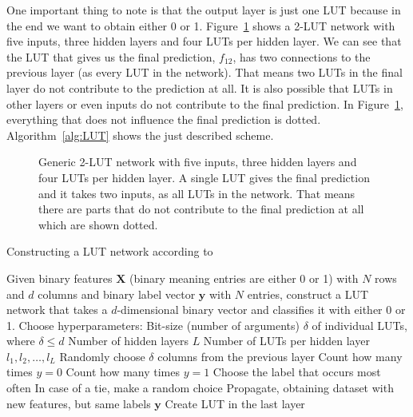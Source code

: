 \noindent One important thing to note is that the output layer is just one LUT because in the end we want to obtain either 0 or 1. Figure~\ref{fig:medium_LUT_network} shows a 2-LUT network with five inputs, three hidden layers and four LUTs per hidden layer. We can see that the LUT that gives us the final prediction, $f_{12}$, has two connections to the previous layer (as every LUT in the network). That means two LUTs in the final layer do not contribute to the prediction at all. It is also possible that LUTs in other layers or even inputs do not contribute to the final prediction. In Figure~\ref{fig:medium_LUT_network}, everything that does not influence the final prediction is dotted. Algorithm~\ref{alg:LUT} shows the just described scheme.

\begin{figure}[!htb]
    \centering
    
    \caption{Generic 2-LUT network with five inputs, three hidden layers and four LUTs per hidden layer. A single LUT gives the final prediction and it takes two inputs, as all LUTs in the network. That means there are parts that do not contribute to the final prediction at all which are shown dotted.}
\label{fig:medium_LUT_network}
\end{figure}
\FloatBarrier


\begin{algorithm}
  \caption{Constructing a LUT network according to \cite{bib:chatterjee2018learning}}
  \label{alg:LUT}
  \begin{algorithmic}
    \State Given binary features $\boldsymbol{X}$ (binary meaning entries are either 0 or 1) with $N$ rows and $d$ columns and binary label vector $\bm{y}$ with $N$ entries, construct a LUT network that takes a $d$-dimensional binary vector and classifies it with either 0 or 1.
    \vspace{1em}
    \State Choose hyperparameters:
      \Statein Bit-size (number of arguments) $\delta$ of individual LUTs, where $\delta \leq d$
      \Statein Number of hidden layers $L$
      \Statein Number of LUTs per hidden layer $l_1, l_2, \dots, l_L$
        \State Randomly choose $\delta$ columns from the previous layer
          \State Count how many times $y=0$
          \State Count how many times $y=1$
          \State Choose the label that occurs most often
          \State In case of a tie, make a random choice
        \EndFor
      \EndFor
      \State Propagate, obtaining dataset with new features, but same labels $\bm{y}$
    \EndFor
    \State Create LUT in the last layer
  \end{algorithmic}
\end{algorithm}
\FloatBarrier

